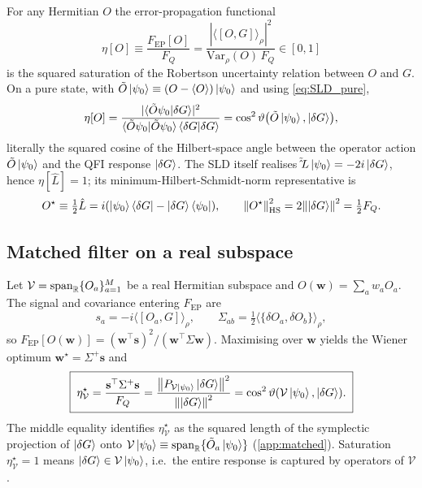 \documentclass[11pt,a4paper]{article}
\newcommand{\FQ}{F_Q}
\newcommand{\FEP}{F_{\mathrm{EP}}}
\newcommand{\Var}{\mathrm{Var}}
\newcommand{\SLD}{\hat{L}}
\newcommand{\PsiZ}{\ket{\psi_0}}
\newcommand{\BraZ}{\bra{\psi_0}}
\newcommand{\dG}{\ket{\delta G}}
\newcommand{\dGb}{\bra{\delta G}}
\providecommand{\anticomm}[2]{\{#1,#2\}}\renewcommand{\anticomm}[2]{\{#1,#2\}}
\begin{document}
For any Hermitian $O$ the error-propagation functional
\begin{equation}
   \eta[O]\equiv\frac{\FEP[O]}{\FQ}
   =\frac{|\langle[O,G]\rangle_\rho|^2}{\Var_\rho(O)\,\FQ}
   \in[0,1]
   \label{eq:eta_def}
\end{equation}
is the squared saturation of the Robertson uncertainty relation
between $O$ and $G$.  On a pure state, with
$\tilde O\PsiZ\equiv(O-\langle O\rangle)\PsiZ$ and using
\eqref{eq:SLD_pure},
\begin{equation}
   \eta[O]=\frac{|\langle\tilde O\psi_0|\delta G\rangle|^2}
                {\langle\tilde O\psi_0|\tilde O\psi_0\rangle\,
                 \langle\delta G|\delta G\rangle}
   =\cos^2\vartheta\bigl(\tilde O\PsiZ,\dG\bigr),
   \label{eq:eta_cos}
\end{equation}
literally the squared cosine of the Hilbert-space angle between the
operator action $\tilde O\PsiZ$ and the QFI response $\dG$.  The
SLD itself realises $\tilde\SLD\PsiZ=-2i\dG$, hence $\eta[\SLD]=1$;
its minimum-Hilbert-Schmidt-norm representative is
\begin{equation}
   O^\star\equiv\tfrac12\SLD=i(\PsiZ\dGb-\dG\BraZ),\qquad
   \norm{O^\star}_{\rm HS}^2=2\norm{\dG}^2=\tfrac12\FQ.
   \label{eq:Ostar}
\end{equation}

\subsection{Matched filter on a real subspace}
\label{sec:matched}

Let $\mathcal V={\rm span}_{\mathbb R}\{O_a\}_{a=1}^M$ be a real
Hermitian subspace and $O(\mathbf w)=\sum_aw_aO_a$.  The signal and
covariance entering $\FEP$ are
\begin{equation}
   s_a=-i\langle[O_a,G]\rangle_\rho,\qquad
   \Sigma_{ab}=\tfrac12\langle\anticomm{\delta O_a}{\delta O_b}\rangle_\rho,
   \label{eq:s_Sigma}
\end{equation}
so $\FEP[O(\mathbf w)]=(\mathbf w^\top\mathbf s)^2/(\mathbf w^\top\Sigma\mathbf w)$.
Maximising over $\mathbf w$ yields the Wiener optimum
$\mathbf w^\star=\Sigma^+\mathbf s$ and
\begin{equation}
   \boxed{\;\eta^\star_{\mathcal V}
   =\frac{\mathbf s^\top\Sigma^+\mathbf s}{\FQ}
   =\frac{\norm{P_{\mathcal V\PsiZ}\dG}^2}{\norm{\dG}^2}
   =\cos^2\vartheta(\mathcal V\PsiZ,\dG).\;}
   \label{eq:eta_star}
\end{equation}
The middle equality identifies $\eta^\star_{\mathcal V}$ as the
squared length of the symplectic projection of $\dG$ onto
$\mathcal V\PsiZ\equiv{\rm span}_{\mathbb R}\{\tilde O_a\PsiZ\}$
(\cref{app:matched}).  Saturation $\eta^\star_{\mathcal V}=1$ means
$\dG\in\mathcal V\PsiZ$, i.e.\ the entire response is captured by
operators of $\mathcal V$.
\end{document}
